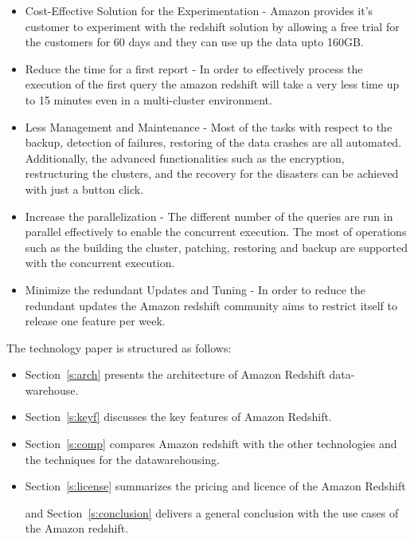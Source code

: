 \begin{itemize}

\item Cost-Effective Solution for the Experimentation - Amazon provides 
it’s customer to experiment with the redshift solution by allowing a free 
trial for the customers for 60 days and they can use up the data upto 160GB. 

\item Reduce the time for a first report - In order to effectively process 
the execution of the first query the amazon redshift will take a very less 
time up to 15 minutes even in a multi-cluster environment.

\item Less Management and Maintenance - Most of the tasks with respect 
to the backup, detection of failures, restoring of the data crashes are 
all automated. Additionally, the advanced functionalities such as the 
encryption, restructuring the clusters, and the recovery for the 
disasters can be achieved with just a button click.

\item Increase the parallelization - The different number of the queries 
are run in parallel effectively to enable the concurrent execution. 
The most of operations such as the building the cluster, patching, 
restoring and backup are supported with the concurrent execution.

\item Minimize the redundant Updates and Tuning - In order to reduce 
the redundant updates the Amazon redshift community aims to restrict 
itself to release one feature per week.

\end{itemize}

	The technology paper is structured as follows:

	\begin{itemize}
	\item Section~\ref{s:arch} presents the architecture of Amazon 
	Redshift data-warehouse.
			
	\item Section~\ref{s:keyf} discusses the key features of 
	Amazon Redshift.
			
	\item Section~\ref{s:comp} compares Amazon redshift with the other 
	technologies and the techniques for the datawarehousing.
		
	\item Section~\ref{s:license}
	summarizes the pricing and licence of the Amazon Redshift 
			
	and Section~\ref{s:conclusion} delivers a general conclusion 
	with the use cases of the Amazon redshift.
			
	\end{itemize}

